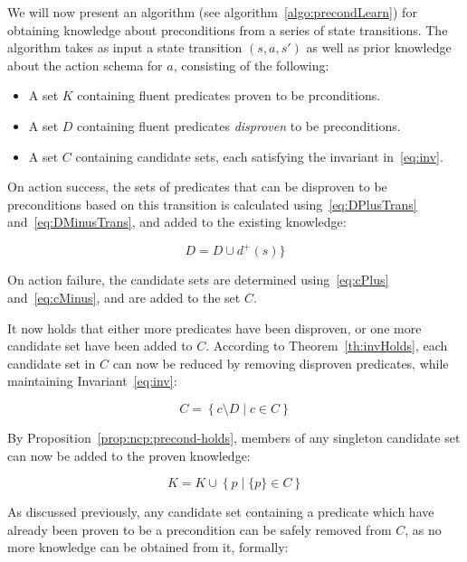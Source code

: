 \documentclass[../../Master.tex]{subfiles}
\begin{document}
We will now present an algorithm (see algorithm~\ref{algo:precondLearn}) for obtaining knowledge about preconditions from a series of state transitions. The algorithm takes as input a state transition $(s, a, s')$ as well as prior knowledge about the action schema for $a$, consisting of the following:

\begin{itemize}
    \item A set $K$ containing fluent predicates proven to be prconditions.
	\item A set $D$ containing fluent predicates \emph{disproven} to be preconditions.
    \item A set $C$ containing candidate sets, each satisfying the invariant in~\eqref{eq:inv}.
\end{itemize}

On action success, the sets of predicates that can be disproven to be preconditions based on this transition is calculated using~\eqref{eq:DPlusTrans} and~\eqref{eq:DMinusTrans}, and added to the existing knowledge:

\begin{equation*}
    D = D \cup d^+(s)\}
\end{equation*}

On action failure, the candidate sets are determined using~\eqref{eq:cPlus} and~\eqref{eq:cMinus}, and are added to the set $C$.

It now holds that either more predicates have been disproven, or one more candidate set have been added to $C$. According to Theorem~\ref{th:invHolds}, each candidate set in $C$ can now be reduced by removing disproven predicates, while maintaining Invariant~\eqref{eq:inv}:

\begin{equation} \label{reduceCands}
    C = \left\{ c \setminus D \; | \; c \in C \right\}
\end{equation}

By Proposition~\ref{prop:ncp:precond-holds}, members of any singleton candidate set can now be added to the proven knowledge:

\begin{equation} \label{eq:extractKnown}
    K = K \cup \left\{ p \; | \; \{ p \} \in C \right\}
\end{equation}

As discussed previously, any candidate set containing a predicate which have already been proven to be a precondition can be safely removed from $C$, as no more knowledge can be obtained from it, formally:
\end{document}
